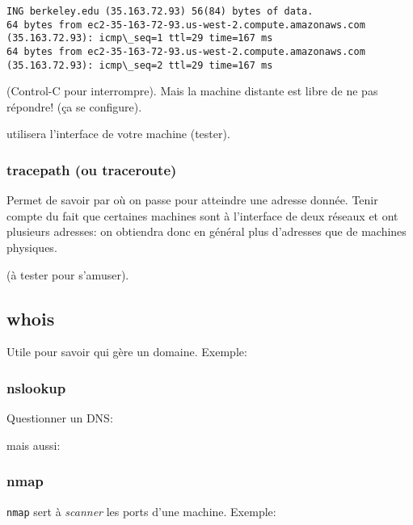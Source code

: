 \smallskip

\begin{verbatim}
ING berkeley.edu (35.163.72.93) 56(84) bytes of data.
64 bytes from ec2-35-163-72-93.us-west-2.compute.amazonaws.com (35.163.72.93): icmp\_seq=1 ttl=29 time=167 ms
64 bytes from ec2-35-163-72-93.us-west-2.compute.amazonaws.com (35.163.72.93): icmp\_seq=2 ttl=29 time=167 ms
\end{verbatim}
(Control-C pour interrompre). Mais la machine distante est libre de ne
pas répondre! (ça se configure).\smallskip

 utilisera l'interface  de votre machine
(tester).
\subsubsection{tracepath (ou traceroute)} Permet de savoir par où on
passe pour atteindre une adresse donnée. Tenir compte du fait que
certaines machines sont à l'interface de deux réseaux et ont plusieurs
adresses: on obtiendra donc en général plus d'adresses que de machines
physiques. 


(à tester pour s'amuser).

\subsection{whois}
Utile pour savoir qui gère un domaine. Exemple:


\subsubsection{nslookup}
Questionner un DNS:



mais aussi:



\subsubsection{nmap}
\texttt{nmap} sert à \emph{scanner} les ports d'une machine. Exemple:

